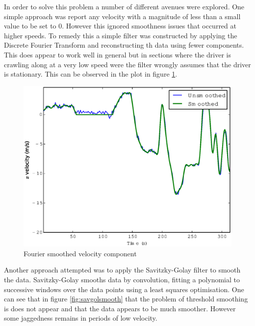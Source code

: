 \documentclass[a4paper, 11pt, twocolumn]{report}
\begin{document}
In order to solve this problem a number of different avenues were explored. One simple approach was report any velocity with a magnitude of less than a small value to be set to 0. However this ignored smoothness issues that occurred at higher speeds. To remedy this a simple filter was constructed by applying the Discrete Fourier Transform and reconstructing th data using fewer components. This does appear to work well in general but in sections where the driver is crawling along at a very low speed were the filter wrongly assumes that the driver is stationary. This can be observed in the plot in figure \ref{fig:fouriersmooth}.

\begin{figure}[h]
    \center
    \includegraphics[width=\linewidth]{fouriersmooth}
    \caption{Fourier smoothed velocity component}
    \label{fig:fouriersmooth}
\end{figure}

Another approach attempted was to apply the Savitzky-Golay filter to smooth the data. Savitzky-Golay smooths data by convolution, fitting a polynomial to successive windows over the data points using a least squares optimisation. One can see that in figure \ref{fig:savgolsmooth} that the problem of threshold smoothing is does not appear and that the data appears to be much smoother. However some jaggedness remains in periods of low velocity.
\end{document}
